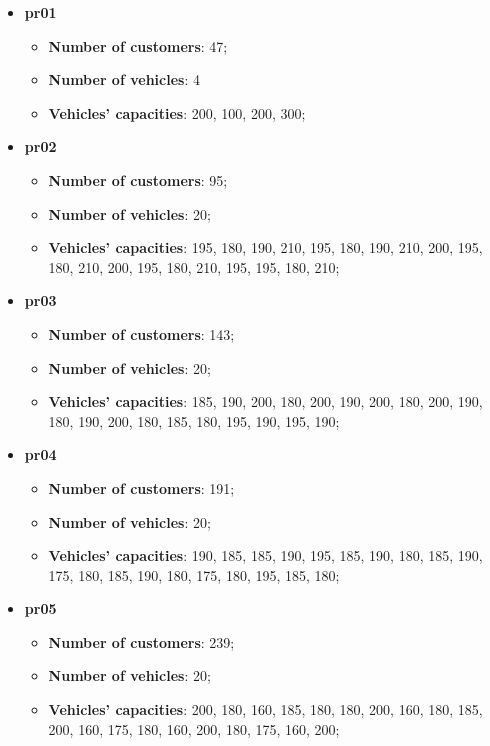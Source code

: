 \documentclass[../main.tex]{subfiles}
\begin{document}
\begin{itemize}
    \item \textbf{pr01}
        \begin{itemize}
            \item \textbf{Number of customers}: 47;
            \item \textbf{Number of vehicles}: 4
            \item \textbf{Vehicles' capacities}: 200, 100, 200, 300;
        \end{itemize}

    \item \textbf{pr02}
        \begin{itemize}
            \item \textbf{Number of customers}: 95;
            \item \textbf{Number of vehicles}: 20;
            \item \textbf{Vehicles' capacities}: 195, 180, 190, 210, 195, 180, 190, 210, 200, 195, 180, 210, 200, 195, 180, 210, 195, 195, 180, 210;
        \end{itemize}
    
    \item \textbf{pr03}
        \begin{itemize}
            \item \textbf{Number of customers}: 143;
            \item \textbf{Number of vehicles}: 20;
            \item \textbf{Vehicles' capacities}: 185, 190, 200, 180, 200, 190, 200, 180, 200, 190, 180, 190, 200, 180, 185, 180, 195, 190, 195, 190;
        \end{itemize}

    \item \textbf{pr04}
        \begin{itemize}
            \item \textbf{Number of customers}: 191;
            \item \textbf{Number of vehicles}: 20;
            \item \textbf{Vehicles' capacities}: 190, 185, 185, 190, 195, 185, 190, 180, 185, 190, 175, 180, 185, 190, 180, 175, 180, 195, 185, 180;
        \end{itemize}

    \item \textbf{pr05}
        \begin{itemize}
            \item \textbf{Number of customers}: 239;
            \item \textbf{Number of vehicles}: 20;
            \item \textbf{Vehicles' capacities}: 200, 180, 160, 185, 180, 180, 200, 160, 180, 185, 200, 160, 175, 180, 160, 200, 180, 175, 160, 200;
        \end{itemize}


\end{itemize}
\end{document}
